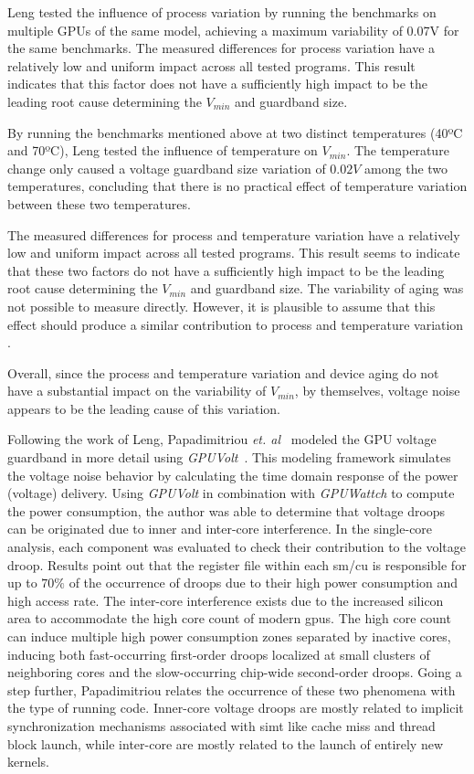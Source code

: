 Leng tested the influence of process variation by running the benchmarks on multiple GPUs of the same model, achieving a maximum variability of 0.07V for the same benchmarks. The measured differences for process variation have a relatively low and uniform impact across all tested programs. This result indicates that this factor does not have a sufficiently high impact to be the leading root cause determining the $V_{min}$ and guardband size.

By running the benchmarks mentioned above at two distinct temperatures (40ºC and 70ºC), Leng tested the influence of temperature on $V_{min}$. The temperature change only caused a voltage guardband size variation of $0.02V$ among the two temperatures, concluding that there is no practical effect of temperature variation between these two temperatures.

The measured differences for process and temperature variation have a relatively low and uniform impact across all tested programs. This result seems to indicate that these two factors do not have a sufficiently high impact to be the leading root cause determining the $V_{min}$ and guardband size.
The variability of aging was not possible to measure directly. However, it is plausible to assume that this effect should produce a similar contribution to process and temperature variation \cite{leng_safe_2015}.

Overall, since the process and temperature variation and device aging do not have a substantial impact on the variability of $V_{min}$, by themselves, voltage noise appears to be the leading cause of this variation.

Following the work of Leng, Papadimitriou \textit{et. al}~\cite{papadimitriou_exceeding_2020} modeled the GPU voltage guardband in more detail using \textit{GPUVolt}~\cite{leng_gpuvolt_2014}. This modeling framework simulates the voltage noise behavior by calculating the time domain response of the power (voltage) delivery. Using \textit{GPUVolt} in combination with \textit{GPUWattch} to compute the power consumption, the author was able to determine that voltage droops can be originated due to inner and inter-core interference. In the single-core analysis, each component was evaluated to check their contribution to the voltage droop. Results point out that the register file within each \acrshort{sm}/\acrshort{cu} is responsible for up to $70\%$ of the occurrence of droops due to their high power consumption and high access rate. The inter-core interference exists due to the increased silicon area to accommodate the high core count of modern \acrshort{gpu}s. The high core count can induce multiple high power consumption zones separated by inactive cores, inducing both fast-occurring first-order droops localized at small clusters of neighboring cores and the slow-occurring chip-wide second-order droops. Going a step further, Papadimitriou relates the occurrence of these two phenomena with the type of running code. Inner-core voltage droops are mostly related to implicit synchronization mechanisms associated with \acrshort{simt} like cache miss and thread block launch, while inter-core are mostly related to the launch of entirely new kernels.

